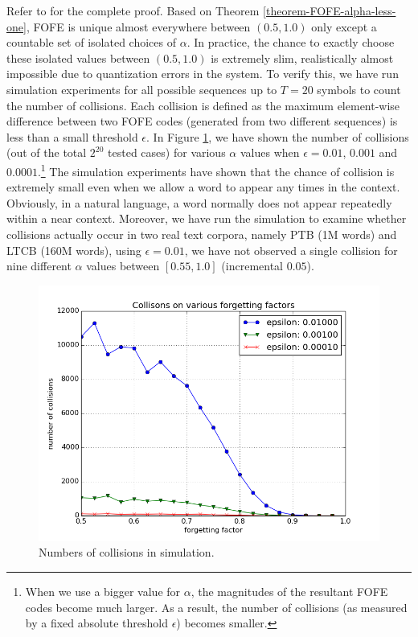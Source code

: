 \documentclass[11pt]{article}
\begin{document}
Refer to \cite{Zhang2015a} for the complete proof. %
Based on Theorem \ref{theorem-FOFE-alpha-less-one}, FOFE is unique almost everywhere between $(0.5, 1.0)$ only except a countable set of isolated choices of $\alpha$. In practice, the chance to exactly choose these isolated values between $(0.5, 1.0)$ is extremely slim, realistically almost impossible due to quantization errors in the system.   To verify this, 
we have run simulation experiments for all possible sequences up to $T=20$ symbols to count the number of collisions. Each collision is defined as the maximum element-wise difference between two FOFE codes (generated from two different sequences) is less than a small threshold $\epsilon$. 
In Figure \ref{fig:collisions}, we have shown the number of collisions (out of the total $2^{20}$ tested cases) for various $\alpha$ values when  $\epsilon=0.01$, $0.001$ and $0.0001$.\footnote{When we use a bigger value for $\alpha$, the magnitudes of the resultant FOFE codes become much larger. As a result, the number of collisions (as measured by a fixed absolute threshold $\epsilon$) becomes smaller.}
The simulation experiments have shown that the chance of collision is extremely small even when we allow a word to appear any times in the context. Obviously, in a natural language, a word normally does not appear repeatedly within a near context. Moreover, we have run the simulation to examine whether collisions actually occur in two real text corpora, namely PTB (1M words) and LTCB (160M words), using $\epsilon=0.01$, we have not observed a single collision for nine different $\alpha$ values between $[0.55, 1.0]$ (incremental $0.05$). 

\begin{figure}[t]
	\centering
	\includegraphics[width=0.85\linewidth]{collision.png}
	\caption{Numbers of collisions in simulation.}
	\label{fig:collisions}
\end{figure}
\end{document}
